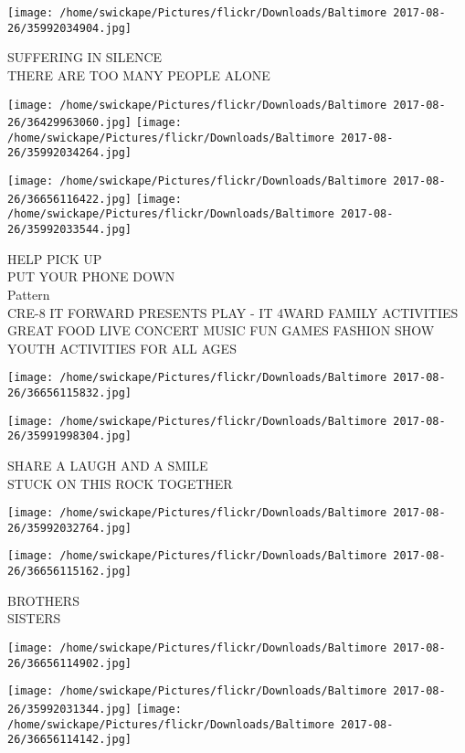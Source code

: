 \documentclass[10pt,letterpaper]{article}
\begin{document}
\vspace{0.25in}
\texttt{[image: /home/swickape/Pictures/flickr/Downloads/Baltimore 2017-08-26/35992034904.jpg]}

SUFFERING IN SILENCE\\
THERE ARE TOO MANY PEOPLE ALONE\\
\pagebreak

\texttt{[image: /home/swickape/Pictures/flickr/Downloads/Baltimore 2017-08-26/36429963060.jpg]}
\texttt{[image: /home/swickape/Pictures/flickr/Downloads/Baltimore 2017-08-26/35992034264.jpg]}

\texttt{[image: /home/swickape/Pictures/flickr/Downloads/Baltimore 2017-08-26/36656116422.jpg]}
\texttt{[image: /home/swickape/Pictures/flickr/Downloads/Baltimore 2017-08-26/35992033544.jpg]}

HELP PICK UP\\
PUT YOUR PHONE DOWN\\
Pattern\\
CRE{-}8 IT FORWARD PRESENTS PLAY {-} IT 4WARD FAMILY ACTIVITIES GREAT FOOD LIVE CONCERT MUSIC FUN GAMES FASHION SHOW YOUTH ACTIVITIES FOR ALL AGES\\
\pagebreak

\texttt{[image: /home/swickape/Pictures/flickr/Downloads/Baltimore 2017-08-26/36656115832.jpg]}

\vspace{0.25in}
\texttt{[image: /home/swickape/Pictures/flickr/Downloads/Baltimore 2017-08-26/35991998304.jpg]}

SHARE A LAUGH AND A SMILE\\
STUCK ON THIS ROCK TOGETHER\\
\pagebreak

\texttt{[image: /home/swickape/Pictures/flickr/Downloads/Baltimore 2017-08-26/35992032764.jpg]}

\vspace{0.25in}
\texttt{[image: /home/swickape/Pictures/flickr/Downloads/Baltimore 2017-08-26/36656115162.jpg]}

BROTHERS\\
SISTERS\\
\pagebreak

\texttt{[image: /home/swickape/Pictures/flickr/Downloads/Baltimore 2017-08-26/36656114902.jpg]}

\vspace{0.25in}
\texttt{[image: /home/swickape/Pictures/flickr/Downloads/Baltimore 2017-08-26/35992031344.jpg]}
\texttt{[image: /home/swickape/Pictures/flickr/Downloads/Baltimore 2017-08-26/36656114142.jpg]}
\end{document}
